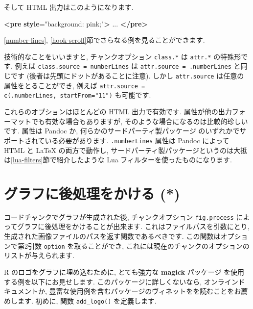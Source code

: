 \documentclass[
  11pt,
  lualatex,ja=standard,jafont=noto]{bxjsreport}
\newenvironment{Shaded}{\begin{snugshade}}{\end{snugshade}}
\newcommand{\ErrorTok}[1]{\textcolor[rgb]{0.64,0.00,0.00}{\textbf{#1}}}
\newcommand{\KeywordTok}[1]{\textcolor[rgb]{0.13,0.29,0.53}{\textbf{#1}}}
\newcommand{\NormalTok}[1]{#1}
\newcommand{\OtherTok}[1]{\textcolor[rgb]{0.56,0.35,0.01}{#1}}
\newcommand{\StringTok}[1]{\textcolor[rgb]{0.31,0.60,0.02}{#1}}
\begin{document}
そして HTML 出力はこのようになります.

\begin{Shaded}
\begin{Highlighting}[]
\KeywordTok{\textless{}pre} \ErrorTok{style}\OtherTok{=}\StringTok{"background: pink;"}\KeywordTok{\textgreater{}}
\NormalTok{...}
\KeywordTok{\textless{}/pre\textgreater{}}
\end{Highlighting}
\end{Shaded}

\ref{number-lines}, \ref{hook-scroll}節でさらなる例を見ることができます.

技術的なことをいいますと, チャンクオプション \texttt{class.*} は \texttt{attr.*} の特殊形です. 例えば \texttt{class.source = \textquotesingle{}numberLines\textquotesingle{}} は \texttt{attr.source = \textquotesingle{}.numberLines\textquotesingle{}} と同じです (後者は先頭にドットがあることに注意). しかし \texttt{attr.source} は任意の属性をとることができ, 例えば \texttt{attr.source = c(\textquotesingle{}.numberLines\textquotesingle{},\ \textquotesingle{}startFrom="11"\textquotesingle{})} も可能です.

これらのオプションはほとんどの HTML 出力で有効です. 属性が他の出力フォーマットでも有効な場合もありますが, そのような場合になるのは比較的珍しいです. 属性は Pandoc か, 何らかのサードパーティ製パッケージ のいずれかでサポートされている必要があります. \texttt{.numberLines} 属性は Pandoc によって HTML と LaTeX の両方で動作し, サードパーティ製パッケージというのは大抵は\ref{lua-filters}節で紹介したような Lua フィルターを使ったものになります.

\hypertarget{fig-process}{%
\section{グラフに後処理をかける (*)}\label{fig-process}}

コードチャンクでグラフが生成された後, チャンクオプション \texttt{fig.process} によってグラフに後処理をかけることが出来ます. これはファイルパスを引数にとり, 生成された画像ファイルのパスを返す関数であるべきです. この関数はオプションで第2引数 \texttt{option} を取ることができ, これには現在のチャンクのオプションのリストが与えられます.

R のロゴをグラフに埋め込むために, とても強力な \textbf{magick} パッケージ \autocite{R-magick} を使用する例を以下にお見せします. このパッケージに詳しくないなら, オンラインドキュメントか, 豊富な使用例を含むパッケージのヴィネットをを読むことをお薦めします. 初めに, 関数 \texttt{add\_logo()} を定義します.
\end{document}
